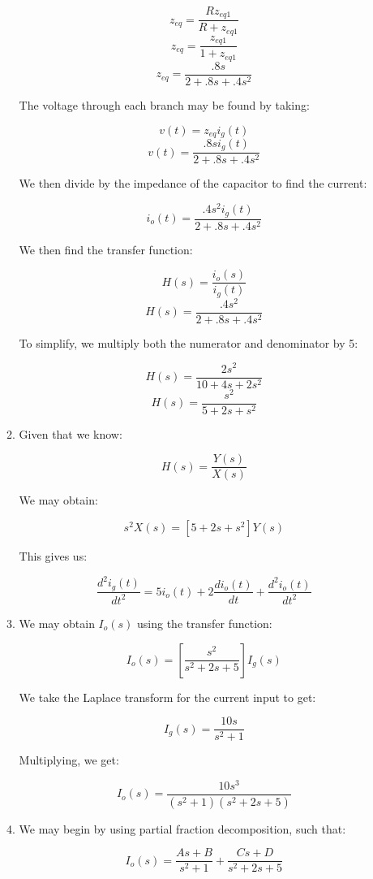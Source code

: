 \begin{enumerate}
\begin{enumerate}
        $$z_{eq}=\frac{Rz_{eq1}}{R+z_{eq1}}$$
        $$z_{eq}=\frac{z_{eq1}}{1+z_{eq1}}$$
        $$z_{eq}=\frac{.8s}{2+.8s+.4s^2}$$

        The voltage through each branch may be found by taking:

        $$v(t)=z_{eq}i_g(t)$$
        $$v(t)=\frac{.8si_g(t)}{2+.8s+.4s^2}$$

        We then divide by the impedance of the capacitor to find the current:

        $$i_o(t)=\frac{.4s^2i_g(t)}{2+.8s+.4s^2}$$

        We then find the transfer function:

        $$H(s)=\frac{i_o(s)}{i_g(t)}$$
        $$H(s)=\frac{.4s^2}{2+.8s+.4s^2}$$

        To simplify, we multiply both the numerator and denominator by 5:

        $$H(s)=\frac{2s^2}{10+4s+2s^2}$$
        $$\boxed{H(s)=\frac{s^2}{5+2s+s^2}}$$

      \item 

        Given that we know:

        $$H(s)=\frac{Y(s)}{X(s)}$$

        We may obtain:

        $$s^2X(s)=[5+2s+s^2]Y(s)$$

        This gives us:

        $$\boxed{\frac{d^2i_g(t)}{dt^2}=5i_o(t)+2\frac{di_o(t)}{dt}+\frac{d^2i_o(t)}{dt^2}}$$

      \item 

        We may obtain $I_o(s)$ using the transfer function:

        $$I_o(s)=\left[ \frac{s^2}{s^2+2s+5} \right]I_g(s)$$

        We take the Laplace transform for the current input to get:

        $$I_g(s)=\frac{10s}{s^2+1}$$

        Multiplying, we get:

        $$\boxed{I_o(s)=\frac{10s^3}{(s^2+1)(s^2+2s+5)}}$$

      \item 

        We may begin by using partial fraction decomposition, such that:

        $$I_o(s)=\frac{As+B}{s^2+1}+\frac{Cs+D}{s^2+2s+5}$$


\end{enumerate}
\end{enumerate}
